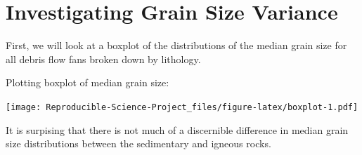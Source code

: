 \documentclass[
]{book}
\newenvironment{Shaded}{\begin{snugshade}}{\end{snugshade}}
\newcommand{\DataTypeTok}[1]{\textcolor[rgb]{0.13,0.29,0.53}{#1}}
\newcommand{\FloatTok}[1]{\textcolor[rgb]{0.00,0.00,0.81}{#1}}
\newcommand{\KeywordTok}[1]{\textcolor[rgb]{0.13,0.29,0.53}{\textbf{#1}}}
\newcommand{\NormalTok}[1]{#1}
\newcommand{\OperatorTok}[1]{\textcolor[rgb]{0.81,0.36,0.00}{\textbf{#1}}}
\newcommand{\StringTok}[1]{\textcolor[rgb]{0.31,0.60,0.02}{#1}}
\begin{document}
\hypertarget{investigating-grain-size-variance}{%
\chapter{Investigating Grain Size Variance}\label{investigating-grain-size-variance}}

First, we will look at a boxplot of the distributions of the median grain size
for all debris flow fans broken down by lithology.

Plotting boxplot of median grain size:

\begin{Shaded}
\end{Shaded}

\texttt{[image: Reproducible-Science-Project\_files/figure-latex/boxplot-1.pdf]}

It is surpising that there is not much of a discernible difference in median
grain size distributions between the sedimentary and igneous rocks.
\end{document}
